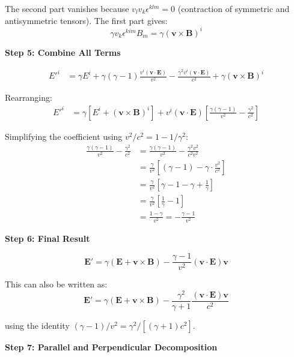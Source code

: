 \documentclass[12pt,a4paper]{article}
\begin{document}
The second part vanishes because $v_l v_k \epsilon^{klm} = 0$ (contraction of
symmetric and antisymmetric tensors). The first part gives:
\begin{equation}
\gamma v_k \epsilon^{kim} B_m = \gamma (\bm{v} \times \bm{B})^i
\end{equation}

\textbf{Step 5: Combine All Terms}

\begin{align}
E'^i &= \gamma E^i + \gamma(\gamma-1)\frac{v^i (\bm{v} \cdot \bm{E})}{v^2}
- \frac{\gamma^2 v^i (\bm{v} \cdot \bm{E})}{c^2}
+ \gamma (\bm{v} \times \bm{B})^i
\end{align}

Rearranging:
\begin{align}
E'^i &= \gamma \left[E^i + (\bm{v} \times \bm{B})^i\right]
+ v^i (\bm{v} \cdot \bm{E}) \left[\frac{\gamma(\gamma-1)}{v^2} - \frac{\gamma^2}{c^2}\right]
\end{align}

Simplifying the coefficient using $v^2/c^2 = 1 - 1/\gamma^2$:
\begin{align}
\frac{\gamma(\gamma-1)}{v^2} - \frac{\gamma^2}{c^2}
&= \frac{\gamma(\gamma-1)}{v^2} - \frac{\gamma^2 v^2}{c^2 v^2} \\
&= \frac{\gamma}{v^2}\left[(\gamma-1) - \gamma \cdot \frac{v^2}{c^2}\right] \\
&= \frac{\gamma}{v^2}\left[\gamma - 1 - \gamma + \frac{1}{\gamma}\right] \\
&= \frac{\gamma}{v^2}\left[\frac{1}{\gamma} - 1\right] \\
&= \frac{1 - \gamma}{v^2} = -\frac{\gamma - 1}{v^2}
\end{align}

\textbf{Step 6: Final Result}

\begin{equation}
\boxed{
\bm{E}' = \gamma(\bm{E} + \bm{v} \times \bm{B}) - \frac{\gamma - 1}{v^2}(\bm{v} \cdot \bm{E})\bm{v}
}
\label{eq:E_transform}
\end{equation}

This can also be written as:
\begin{equation}
\bm{E}' = \gamma(\bm{E} + \bm{v} \times \bm{B}) - \frac{\gamma^2}{\gamma + 1}
\frac{(\bm{v} \cdot \bm{E})\bm{v}}{c^2}
\label{eq:E_transform_alt}
\end{equation}

using the identity $(\gamma-1)/v^2 = \gamma^2/[(\gamma+1)c^2]$.

\textbf{Step 7: Parallel and Perpendicular Decomposition}
\end{document}
